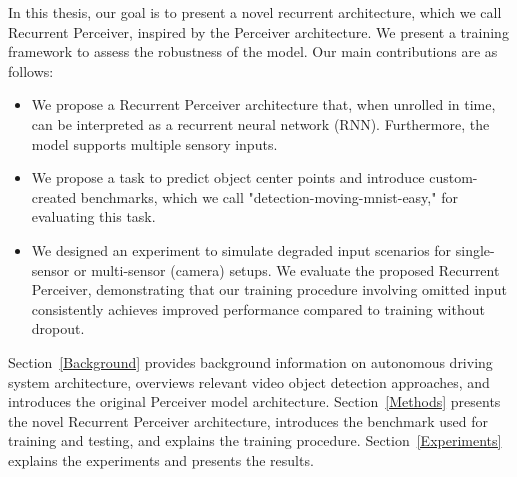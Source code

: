 In this thesis, our goal is to present a novel recurrent architecture, which we call Recurrent Perceiver, inspired by the Perceiver architecture. We present a training framework to assess the robustness of the model.
Our main contributions are as follows:

\begin{itemize}
\item We propose a Recurrent Perceiver architecture that, when unrolled in time, can be interpreted as a recurrent neural network (RNN). Furthermore, the model supports multiple sensory inputs.
\item We propose a task to predict object center points and introduce custom-created benchmarks, which we call "detection-moving-mnist-easy," for evaluating this task.
\item We designed an experiment to simulate degraded input scenarios for single-sensor or multi-sensor (camera) setups. We evaluate the proposed Recurrent Perceiver, demonstrating that our training procedure involving omitted input consistently achieves improved performance compared to training without dropout.
\end{itemize}



Section~\ref{Background} provides background information on autonomous driving system architecture, overviews relevant video object detection approaches, and introduces the original Perceiver model architecture. Section~\ref{Methods} presents the novel Recurrent Perceiver architecture, introduces the benchmark used for training and testing, and explains the training procedure. Section~\ref{Experiments} explains the experiments and presents the results.


